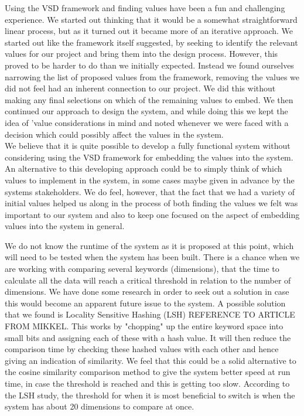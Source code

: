 Using the VSD framework and finding values have been a fun and challenging experience. We started out thinking that it would be a somewhat straightforward linear process, but as it turned out it became more of an iterative approach. We started out like the framework itself suggested, by seeking to identify the relevant values for our project and bring them into the design process. However, this proved to be harder to do than we initially expected. Instead we found ourselves narrowing the list of proposed values from the framework, removing the values we did not feel had an inherent connection to our project. We did this without making any final selections on which of the remaining values to embed. We then continued our approach to design the system, and while doing this we kept the idea of 'value considerations in mind and noted whenever we were faced with a decision which could possibly affect the values in the system. \\
We believe that it is quite possible to develop a fully functional system without considering using the VSD framework for embedding the values into the system. An alternative to this developing approach could be to simply think of which values to implement in the system, in some cases maybe given in advance by the systems stakeholders. We do feel, however, that the fact that we had a variety of initial values helped us along in the process of both finding the values we felt was important to our system and also to keep one focused on the aspect of embedding values into the system in general.

We do not know the runtime of the system as it is proposed at this point, which will need to be tested when the system has been built. There is a chance when we are working with comparing several keywords (dimensions), that the time to calculate all the data will reach a critical threshold in relation to the number of dimensions.  We have done some research in order to seek out a solution in case this would become an apparent future issue to the system. A possible solution that we found is Locality Sensitive Hashing (LSH) REFERENCE TO ARTICLE FROM MIKKEL. This works by "chopping" up the entire keyword space into small bits and assigning each of these with a hash value. It will then reduce the   comparison time by checking these hashed values with each other and hence giving an indication of similarity. We feel that this could be a solid alternative to the cosine similarity comparison method to give the system better speed at run time, in case the threshold is reached and this is getting too slow. According to the LSH study, the threshold for when it is most beneficial to switch is when the system has about 20 dimensions to compare at once.
